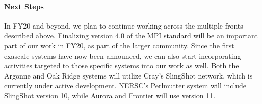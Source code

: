 

\paragraph{Next Steps}
In FY20 and beyond, we plan to continue working across the multiple fronts described above.  Finalizing version 4.0 of the MPI standard will be an important part of our work in FY20, as part of the larger community.  Since the first exascale systems have now been announced, we can also start incorporating activities targeted to those specific systems into our work as well.  Both the Argonne and Oak Ridge systems will utilize Cray's SlingShot network, which is currently under active development.  NERSC's Perlmutter system will include SlingShot version 10, while Aurora and Frontier will use version 11.
